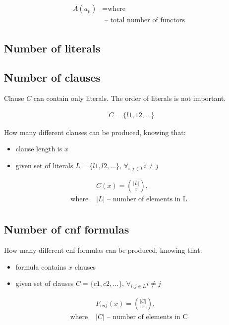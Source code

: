 \begin{align*}
	A(a_p) &=
	\text{where} \\
	& \text{ -- total number of functors} \\
\end{align*}

\subsection{Number of literals}

\subsection{Number of clauses}

Clause $C$ can contain only literals. The order of literals is not important.

\begin{align*}
	&C = \{l1, 12, \dots\}
\end{align*}

How many different clauses can be produced, knowing that:
\begin{itemize}
	\item clause length is $x$
	\item given set of literals $L = \{l1, l2, \dots\}$, $\forall_{i,j \in L} i \neq j$
\end{itemize}

\begin{align*}
	&C(x) = \binom{|L|}{x}, \\
	\text{where }
	&|L| \text{ -- number of elements in L} \\
\end{align*}

\subsection{Number of cnf formulas}

How many different cnf formulas can be produced, knowing that:
\begin{itemize}
	\item formula contains $x$ clauses
	\item given set of clauses $C = \{c1, c2, \dots\}$, $\forall_{i,j \in L} i \neq j$
\end{itemize}

\begin{align*}
	&F_{cnf}(x) = \binom{|C|}{x}, \\
	\text{where }
	&|C| \text{ -- number of elements in C} \\
\end{align*}
